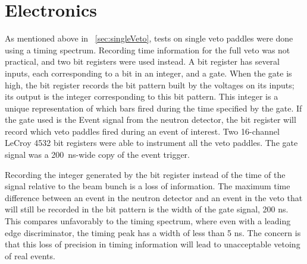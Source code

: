 \section{Electronics}

As mentioned above in {\sect}~\ref{sec:singleVeto}, tests on single veto paddles were done using a timing spectrum.  Recording time information for the full veto was not practical, and two bit registers were used instead.  A bit register has several inputs, each corresponding to a bit in an integer, and a gate.  When the gate is high, the bit register records the bit pattern built by the voltages on its inputs; its output is the integer corresponding to this bit pattern.  This integer is a unique representation of which bars fired during the time specified by the gate.  If the gate used is the Event signal from the neutron detector, the bit register will record which veto paddles fired during an event of interest.  Two 16-channel LeCroy 4532 bit registers were able to instrument all the veto paddles.  The gate signal was a 200~ns-wide copy of the event trigger.

Recording the integer generated by the bit register instead of the time of the signal relative to the beam bunch is a loss of information.  The maximum time difference between an event in the neutron detector and an event in the veto that will still be recorded in the bit pattern is the width of the gate signal, 200 ns.  This compares unfavorably to the timing spectrum, where even with a leading edge discriminator, the timing peak has a width of less than 5 ns.  The concern is that this loss of precision in timing information will lead to unacceptable vetoing of real events.  

